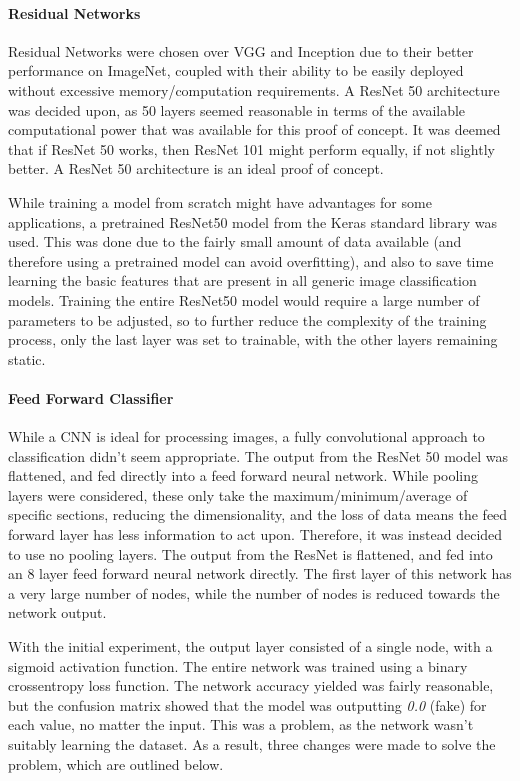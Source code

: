 \documentclass[11pt,a4paper]{article}
\begin{document}
                \paragraph{Residual Networks}
                Residual Networks were chosen over VGG and Inception due to their better performance on ImageNet, coupled with their ability to be easily deployed without excessive memory/computation requirements.
                A ResNet 50 architecture was decided upon, as 50 layers seemed reasonable in terms of the available computational power that was available for this proof of concept. It was deemed that if ResNet 50 works, then ResNet 101 might perform equally, if not
                slightly better. A ResNet 50 architecture is an ideal proof of concept.

                While training a model from scratch might have advantages for some applications, a pretrained ResNet50 model from the Keras standard library was used. This was done due to the fairly small amount of data
                available (and therefore using a pretrained model can avoid overfitting), and also to save time learning the basic features that are present in all generic image classification models. Training the entire
                ResNet50 model would require a large number of parameters to be adjusted, so to further reduce the complexity of the training process, only the last layer was set to trainable, with the other layers remaining static.


                \paragraph{Feed Forward Classifier}
                While a CNN is ideal for processing images, a fully convolutional approach to classification didn't seem appropriate. The output from the ResNet 50 model was flattened, and fed directly into a feed forward neural network.
                While pooling layers were considered, these only take the maximum/minimum/average of specific sections, reducing the dimensionality, and the loss of data means the feed forward layer has less information to act upon. Therefore,
                it was instead decided to use no pooling layers. The output from the ResNet is flattened, and fed into an 8 layer feed forward neural network directly. The first layer of this network has a very large number of nodes,
                while the number of nodes is reduced towards the network output.
                
                With the initial experiment, the output layer consisted of a single node, with a sigmoid activation function. The entire network was trained using a binary crossentropy loss function. The network accuracy yielded was fairly reasonable,
                but the confusion matrix showed that the model was outputting \emph{0.0} (fake) for each value, no matter the input. This was a problem, as the network wasn't suitably learning the dataset. As a result, three changes were made to solve the problem, which are outlined below.
                
\end{document}
